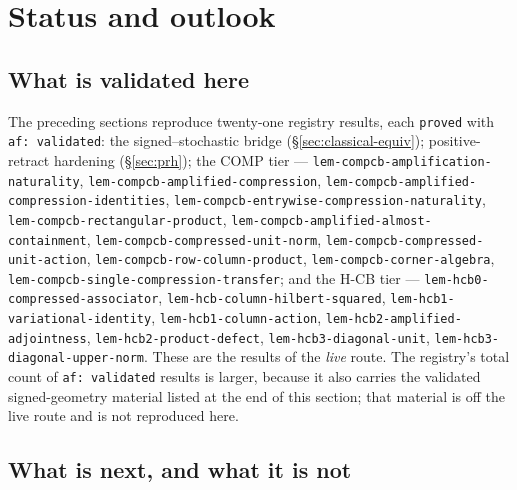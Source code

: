 \section{Status and outlook}\label{sec:status-outlook}

\subsection*{What is validated here}

The preceding sections reproduce twenty-one registry results, each \texttt{proved} with
\texttt{af: validated}: the signed--stochastic bridge (\S\ref{sec:classical-equiv});
positive-retract hardening (\S\ref{sec:prh}); the COMP tier ---
\texttt{lem-compcb-amplification-naturality},
\texttt{lem-compcb-amplified-compression},
\texttt{lem-compcb-amplified-compression-identities},
\texttt{lem-compcb-entrywise-compression-naturality},
\texttt{lem-compcb-rectangular-product},
\texttt{lem-compcb-amplified-almost-containment},
\texttt{lem-compcb-compressed-unit-norm},
\texttt{lem-compcb-compressed-unit-action},
\texttt{lem-compcb-row-column-product},
\texttt{lem-compcb-corner-algebra},
\texttt{lem-compcb-single-compression-transfer};
and the H-CB tier ---
\texttt{lem-hcb0-compressed-associator},
\texttt{lem-hcb-column-hilbert-squared},
\texttt{lem-hcb1-variational-identity},
\texttt{lem-hcb1-column-action},
\texttt{lem-hcb2-amplified-adjointness},
\texttt{lem-hcb2-product-defect},
\texttt{lem-hcb3-diagonal-unit},
\texttt{lem-hcb3-diagonal-upper-norm}.
These are the results of the \emph{live} route. The registry's total count of
\texttt{af: validated} results is larger, because it also carries the validated
signed-geometry material listed at the end of this section; that material is off the
live route and is not reproduced here.

\subsection*{What is next, and what it is not}

